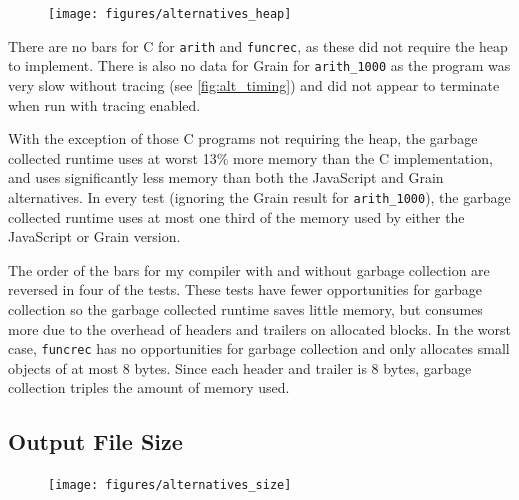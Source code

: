 \begin{figure}[H]
\hspace{-1cm}
\texttt{[image: figures/alternatives\_heap]}
 \label{fig:alt_heap} 
\end{figure}

There are no bars for C for \verb|arith| and \verb|funcrec|, as these did not require the heap to implement. 
There is also no data for Grain for \verb|arith_1000| as the program was very slow without tracing (see \ref{fig:alt_timing}) and did not appear to terminate when run with tracing enabled.

With the exception of those C programs not requiring the heap, the garbage collected runtime uses at worst 13\% more memory than the C implementation, and uses significantly less memory than both the JavaScript and Grain alternatives. In every test (ignoring the Grain result for \verb|arith_1000|), the garbage collected runtime uses at most one third of the memory used by either the JavaScript or Grain version. 

The order of the bars for my compiler with and without garbage collection are reversed in four of the tests. These tests have fewer opportunities for garbage collection so the garbage collected runtime saves little memory, but consumes more due to the overhead of headers and trailers on allocated blocks. In the worst case, \verb|funcrec| has no opportunities for garbage collection and only allocates small objects of at most 8 bytes. Since each header and trailer is 8 bytes, garbage collection triples the amount of memory used.



\subsection{Output File Size}

\begin{figure}[H]
\hspace{-1cm}
\texttt{[image: figures/alternatives\_size]}
 \label{fig:alt_size} 
\end{figure}


